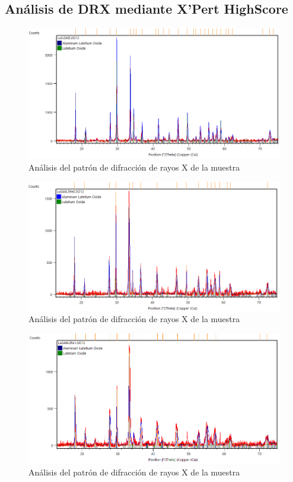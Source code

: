 \begin{appendix}
	\chapter{Análisis de DRX mediante X'Pert HighScore}\label{AnexoA}

	\begin{figure}[h]
		\centering%
		\includegraphics[width=\textwidth]{Anexos/x=0.png}%
		\caption{Análisis del patrón de difracción de rayos X de la muestra
		} \label{fig:XpertX0}
	\end{figure}

	\begin{figure}[h]
		\centering%
		\includegraphics[width=\textwidth]{Anexos/x=05.png}%
		\caption{Análisis del patrón de difracción de rayos X de la muestra
		} \label{fig:XpertX05}
	\end{figure}

	\begin{figure}[h]
		\centering%
		\includegraphics[width=\textwidth]{Anexos/x=10.png}%
		\caption{Análisis del patrón de difracción de rayos X de la muestra
		}
		\label{fig:XpertX10}
	\end{figure}


\end{appendix}
